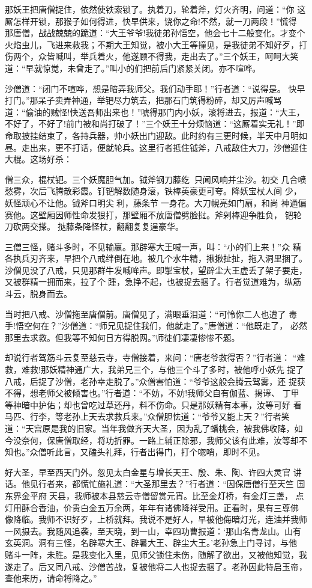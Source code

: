 那妖王把唐僧捉住，依然使铁索锁了。执着刀，轮着斧，灯火齐明，问道：“你
这厮怎样开锁，那猴子如何得进，快早供来，饶你之命!不然，就一刀两段！”慌得
那唐僧，战战兢兢的跪道：“大王爷爷!我徒弟孙悟空，他会七十二般变化。才变个
火焰虫儿，飞进来救我；不期大王知觉，被小大王等撞见，是我徒弟不知好歹，打
伤两个，众皆喊叫，举兵着火，他遂顾不得我，走出去了。”三个妖王，呵呵大笑
道：“早就惊觉，未曾走了。”叫小的们把前后门紧紧关闭。亦不喧哗。

沙僧道：“闭门不喧哗，想是暗弄我师父。我们动手耶！”行者道：“说得是。
快早打门。”那呆子卖弄神通，举钯尽力筑去，把那石门筑得粉碎，却又厉声喊骂
道：“偷油的贼怪!快送吾师出来也！”唬得那门内小妖，滚将进去，报道：“大王，
不好了，不好了!前门被和尚打破了！”三个妖王十分烦恼道：“这厮着实无礼！”即
命取披挂结束了，各持兵器，帅小妖出门迎敌。此时约有三更时候，半天中月明如
昼。走出来，更不打话，便就轮兵。这里行者抵住钺斧，八戒敌住大刀，沙僧迎住
大棍。这场好杀：

僧三众，棍杖钯。三个妖魔胆气加。钺斧钢刀藤纥，只闻风响并尘沙。初交
几合喷愁雾，次后飞腾散彩霞。钉钯解数随身滚，铁棒英豪更可夸。降妖宝杖人间
少，妖怪顽心不让他。钺斧口明尖利，藤条节一身花。大刀幌亮如门扇，和尚
神通偏赛他。这壁厢因师性命发狠打，那壁厢不放唐僧劈脸挝。斧剁棒迎争胜负，
钯轮刀砍两交搽。挞藤条降怪杖，翻翻复复逞豪华。

三僧三怪，赌斗多时，不见输赢。那辟寒大王喊一声，叫：“小的们上来！”众
精各执兵刃齐来，早把个八戒绊倒在地。被几个水牛精，揪揪扯扯，拖入洞里捆了。
沙僧见没了八戒，只见那群牛发喊哞声。即掣宝杖，望辟尘大王虚丢了架子要走，
又被群精一拥而来，拉了个踵，急挣不起，也被捉去捆了。行者觉道难为，纵筋
斗云，脱身而去。

当时把八戒、沙僧拖至唐僧前。唐僧见了，满眼垂泪道：“可怜你二人也遭了
毒手!悟空何在？”沙僧道：“师兄见捉住我们，他就走了。”唐僧道：“他既走了，
必然那里去求救。但我等不知何日方得脱网。”师徒们凄凄惨惨不题。

却说行者驾筋斗云复至慈云寺，寺僧接着，来问：“唐老爷救得否？”行者道：
“难救，难救!那妖精神通广大，我弟兄三个，与他三个斗了多时，被他呼小妖先
捉了八戒，后捉了沙僧，老孙幸走脱了。”众僧害怕道：“爷爷这般会腾云驾雾，还
捉获不得，想老师父被倾害也。”行者道：“不妨，不妨!我师父自有伽蓝、揭谛、
丁甲等神暗中护佑；却也曾吃过草还丹，料不伤命。只是那妖精有本事，汝等可好
看马匹、行李，等老孙上天去求救兵来。”众僧胆怯道：“爷爷又能上天？”行者笑
道：“天宫原是我的旧家。当年我做齐天大圣，因为乱了蟠桃会，被我佛收降，如
今没奈何，保唐僧取经，将功折罪。一路上辅正除邪，我师父该有此难，汝等却不
知也。”众僧听此言，又磕头礼拜，行者出得门，打个唿哨，即时不见。

好大圣，早至西天门外。忽见太白金星与增长天王、殷、朱、陶、许四大灵官
讲话。他见行者来，都慌忙施礼道：“大圣那里去？”行者道：“因保唐僧行至天竺
国东界金平府天县，我师被本县慈云寺僧留赏元宵。比至金灯桥，有金灯三盏，
点灯用酥合香油，价贵白金五万余两，年年有诸佛降祥受用。正看时，果有三尊佛
像降临。我师不识好歹，上桥就拜。我说不是好人，早被他侮暗灯光，连油并我师
一风摄去。我随风追袭，至天晓，到一山，幸四功曹报道：‘那山名青龙山。山有
玄英洞。洞有三怪，名辟寒大王、辟暑大王、辟尘大王。’老孙急上门寻讨，与他
赌斗一阵，未胜。是我变化入里，见师父锁住未伤，随解了欲出，又被他知觉，我
遂走了。后又同八戒、沙僧苦战，复被他将二人也捉去捆了。老孙因此特启玉帝，
查他来历，请命将降之。”

